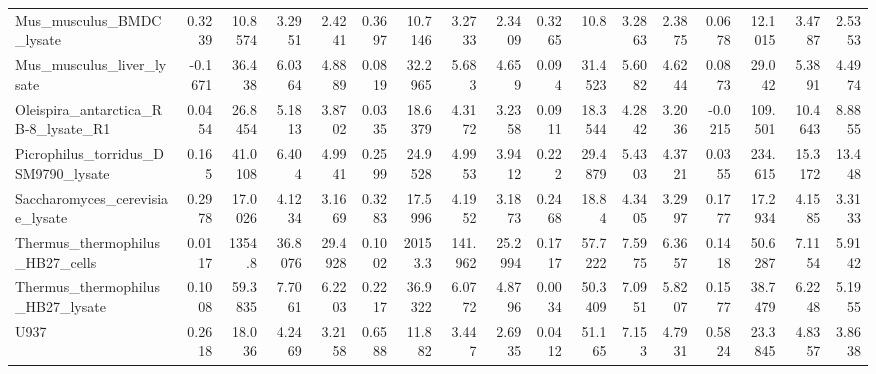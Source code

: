 \begin{tabular}{lrrrrrrrrrrrrrrrr}
 Mus\_musculus\_BMDC\_lysate                    &              0.3239   &          10.8574 &           3.2951  &          2.4241  &         0.3697   &     10.7146 &       3.2733 &     2.3409  &       0.3265   &   10.8    &    3.2863  &   2.3875  &         0.0678   &     12.1015 &      3.4787  &     2.5353  \\
 Mus\_musculus\_liver\_lysate                   &             -0.1671   &          36.438  &           6.0364  &          4.8889  &         0.0819   &     32.2965 &       5.683  &     4.659   &       0.094    &   31.4523 &    5.6082  &   4.6244  &         0.0873   &     29.042  &      5.3891  &     4.4974  \\
 Oleispira\_antarctica\_RB-8\_lysate\_R1         &              0.0454   &          26.8454 &           5.1813  &          3.8702  &         0.0335   &     18.6379 &       4.3172 &     3.2358  &       0.0911   &   18.3544 &    4.2842  &   3.2036  &        -0.0215   &    109.501  &     10.4643  &     8.8855  \\
 Picrophilus\_torridus\_DSM9790\_lysate         &              0.165    &          41.0108 &           6.404   &          4.9941  &         0.2599   &     24.9528 &       4.9953 &     3.9412  &       0.222    &   29.4879 &    5.4303  &   4.3721  &         0.0355   &    234.615  &     15.3172  &    13.448   \\
 Saccharomyces\_cerevisiae\_lysate             &              0.2978   &          17.0026 &           4.1234  &          3.1669  &         0.3283   &     17.5996 &       4.1952 &     3.1873  &       0.2468   &   18.84   &    4.3405  &   3.2997  &         0.1777   &     17.2934 &      4.1585  &     3.3133  \\
 Thermus\_thermophilus\_HB27\_cells             &              0.0117   &        1354.8    &          36.8076  &         29.4928  &         0.1002   &  20153.3    &     141.962  &    25.2994  &       0.1717   &   57.7222 &    7.5975  &   6.3657  &         0.1418   &     50.6287 &      7.1154  &     5.9142  \\
 Thermus\_thermophilus\_HB27\_lysate            &              0.1008   &          59.3835 &           7.7061  &          6.2203  &         0.2217   &     36.9322 &       6.0772 &     4.8796  &       0.0034   &   50.3409 &    7.0951  &   5.8207  &         0.1577   &     38.7479 &      6.2248  &     5.1955  \\
 U937                                        &              0.2618   &          18.036  &           4.2469  &          3.2158  &         0.6588   &     11.882  &       3.447  &     2.6935  &       0.0412   &   51.165  &    7.153   &   4.7931  &         0.5824   &     23.3845 &      4.8357  &     3.8638  \\

\end{tabular}
